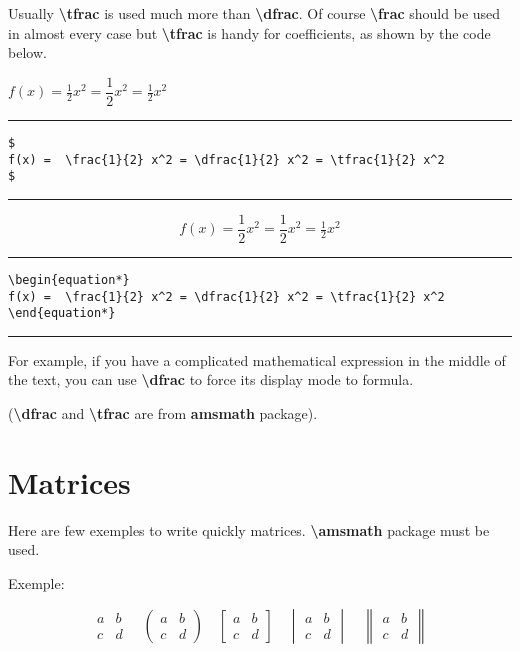 Usually \textbf{\textbackslash tfrac} is used much more than \textbf{\textbackslash dfrac}. Of course \textbf{\textbackslash frac} should be used in almost every case but \textbf{\textbackslash tfrac} is handy for coefficients, as shown by the code below.

$
f(x) =  \frac{1}{2} x^2 = \dfrac{1}{2} x^2 = \tfrac{1}{2} x^2
$

\noindent\vspace{1em}\hrule
\begin{verbatim}
$
f(x) =  \frac{1}{2} x^2 = \dfrac{1}{2} x^2 = \tfrac{1}{2} x^2
$
\end{verbatim}
\noindent\hrule\vspace{1em}

\begin{equation*}
f(x) =  \frac{1}{2} x^2 = \dfrac{1}{2} x^2 = \tfrac{1}{2} x^2
\end{equation*}

\noindent\vspace{1em}\hrule
\begin{verbatim}
\begin{equation*}
f(x) =  \frac{1}{2} x^2 = \dfrac{1}{2} x^2 = \tfrac{1}{2} x^2
\end{equation*}
\end{verbatim}
\noindent\hrule\vspace{1em}

For example, if you have a complicated mathematical expression in the middle of the text, you can use \textbf{\textbackslash dfrac} to force its display mode to formula.

(\textbf{\textbackslash dfrac} and \textbf{\textbackslash tfrac} are from \textbf{amsmath} package).

\section{Matrices}
Here are few exemples to write quickly matrices. \textbf{\textbackslash amsmath} package must be used.

Exemple:

$$
\begin{matrix} 
a & b \\
c & d 
\end{matrix}
\quad
\begin{pmatrix} 
a & b \\
c & d 
\end{pmatrix}
\quad
\begin{bmatrix} 
a & b \\
c & d 
\end{bmatrix}
\quad
\begin{vmatrix} 
a & b \\
c & d 
\end{vmatrix}
\quad
\begin{Vmatrix} 
a & b \\
c & d 
\end{Vmatrix}
$$

